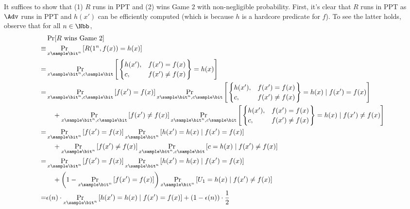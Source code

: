 \begin{answer}[i]
It suffices to show that (1) $R$ runs in PPT and (2) wins Game $2$ with non-negligible probability. First, it's clear that $R$ runs in PPT as $\Adv$ runs in PPT and $h(x')$ can be efficiently computed (which is because $h$ is a hardcore predicate for $f$). To see the latter holds, observe that for all $n\in\Nbb$,
\begin{align}
    &\Pr[R \textrm{ wins Game } 2] \notag\\
    \equiv& \Pr_{x\sample\bit^n}\left[R(1^n, f(x))=h(x) \right] \notag\\
    =&  \Pr_{x\sample\bit^n, c\sample\bit}\left[ \left.\begin{cases}
        h(x'), &f(x')=f(x)\\
        c,     &f(x')\neq f(x)
        \end{cases} \right\} = h(x) \right] \notag\\
    =&  \Pr_{x\sample\bit^n,c\sample\bit}\left[f(x')=f(x)\right]
        \Pr_{x\sample\bit^n,c\sample\bit}\left[ \left.\begin{cases}
        h(x'), &f(x')=f(x)\\
        c,     &f(x')\neq f(x)
        \end{cases} \right\} = h(x) \mid f(x')=f(x)\right] \notag\\
        &\quad + \Pr_{x\sample\bit^n,c\sample\bit}\left[f(x')\neq f(x)\right]
        \Pr_{x\sample\bit^n,c\sample\bit}\left[ \left.\begin{cases}
        h(x'), &f(x')=f(x)\\
        c,     &f(x')\neq f(x)
        \end{cases} \right\} = h(x) \mid f(x')\neq f(x)\right] \notag\\
    =&  \Pr_{x\sample\bit^n}\left[f(x')=f(x)\right]
        \Pr_{x\sample\bit^n}\left[ h(x') = h(x) \mid f(x')=f(x)\right] \notag\\
        &\quad + \Pr_{x\sample\bit^n}\left[f(x')\neq f(x)\right]
        \Pr_{x\sample\bit^n,c\sample\bit}\left[ c = h(x) \mid f(x')\neq f(x)\right] \notag\\
    =&  \Pr_{x\sample\bit^n}\left[f(x')=f(x)\right]
        \Pr_{x\sample\bit^n}\left[ h(x') = h(x) \mid f(x')=f(x)\right] \notag\\
        &\quad + \left( 1- \Pr_{x\sample\bit^n}\left[f(x')=f(x)\right] \right)
        \Pr_{x\sample\bit^n}\left[ U_1 = h(x) \mid f(x')\neq f(x)\right] \notag\\
    =&  \epsilon(n)\cdot \Pr_{x\sample\bit^n}\left[ h(x') = h(x) \mid f(x')=f(x)\right] 
        + \left( 1- \epsilon(n) \right)\cdot \frac{1}{2} 

\end{align}
\end{answer}
